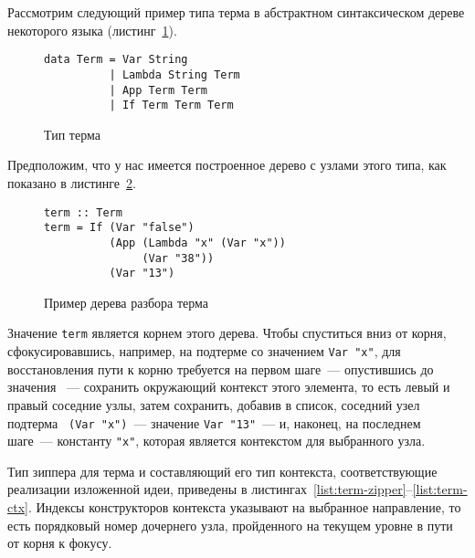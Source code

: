 Рассмотрим следующий пример типа терма в абстрактном синтаксическом дереве некоторого языка (листинг~\ref{list:term-type}).

\begin{figure}[h]
\begin{framed}
\vspace{-0.25cm}
\begin{lstlisting}
data Term = Var String
          | Lambda String Term
          | App Term Term
          | If Term Term Term
\end{lstlisting}
\vspace{-0.25cm}
\end{framed}
\caption{Тип терма}
\label{list:term-type}
\end{figure}

Предположим, что у нас имеется построенное дерево с узлами этого типа, как показано в листинге~\ref{list:term}.
\begin{figure}[h]
\begin{framed}
\vspace{-0.25cm}
\begin{lstlisting}
term :: Term
term = If (Var "false")
          (App (Lambda "x" (Var "x"))
               (Var "38"))
          (Var "13")
\end{lstlisting}
\vspace{-0.25cm}
\end{framed}
\caption{Пример дерева разбора терма}
\label{list:term}
\end{figure}
Значение \lstinline{term} является корнем этого дерева. Чтобы спуститься вниз от корня, сфокусировавшись, например, на подтерме со значением \lstinline{Var "x"}, для восстановления пути к корню требуется на первом шаге~--- опустившись до значения ~--- сохранить окружающий контекст этого элемента, то есть левый и правый соседние узлы, затем сохранить, добавив в список, соседний узел подтерма ~\lstinline{(Var "x")}~--- значение \lstinline{Var "13"}~--- и, наконец, на последнем шаге~--- константу \lstinline{"x"}, которая является контекстом для выбранного узла. 

Тип зиппера для терма и составляющий его тип контекста, соответствующие реализации изложенной идеи, приведены в листингах~\ref{list:term-zipper}--\ref{list:term-ctx}. Индексы конструкторов контекста указывают на выбранное направление, то есть порядковый номер дочернего узла, пройденного на текущем уровне в пути от корня к фокусу.

